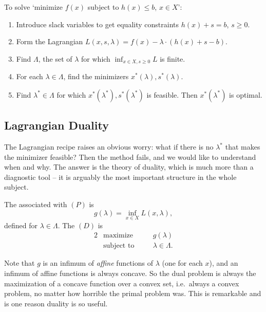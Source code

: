 \begin{remark}
    To solve `minimize $f(x)$ subject to $h(x) \leq b$, $x \in X$':
    \begin{enumerate}[label=(\arabic*)]
        \item Introduce slack variables to get equality constraints $h(x) + s = b$, $s \geq 0$.
        \item Form the Lagrangian $L(x, s, \lambda) = f(x) - \lambda\cdot(h(x) + s - b)$.
        \item Find $\Lambda$, the set of $\lambda$ for which $\inf_{x \in X, s \geq 0}L$ is finite.
        \item For each $\lambda \in \Lambda$, find the minimizers $x^*(\lambda), s^*(\lambda)$.
        \item Find $\lambda^* \in \Lambda$ for which $x^*(\lambda^*), s^*(\lambda^*)$ is feasible. Then $x^*(\lambda^*)$ is optimal.
    \end{enumerate}
\end{remark}

\subsection{Lagrangian Duality}

The Lagrangian recipe raises an obvious worry: what if there is no $\lambda^*$ that makes the minimizer feasible? Then the method fails, and we would like to understand when and why. The answer is the theory of duality, which is much more than a diagnostic tool -- it is arguably the most important structure in the whole subject.

\begin{definition}
    The  associated with $(P)$ is
    $$
    g(\lambda) = \inf_{x \in X}L(x, \lambda),
    $$
    defined for $\lambda \in \Lambda$. The  $(D)$ is
    \begin{alignat*}{2}
        & \text{maximize} \quad && g(\lambda) \\
        & \text{subject to} \quad && \lambda \in \Lambda.
    \end{alignat*}
\end{definition}

Note that $g$ is an infimum of \emph{affine} functions of $\lambda$ (one for each $x$), and an infimum of affine functions is always concave. So the dual problem is always the maximization of a concave function over a convex set, i.e.\ always a convex problem, no matter how horrible the primal problem was. This is remarkable and is one reason duality is so useful.

